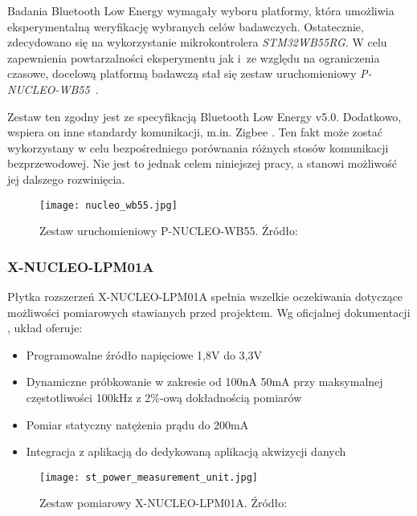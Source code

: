 Badania Bluetooth Low Energy wymagały wyboru platformy, która umożliwia eksperymentalną 
weryfikację wybranych celów badawczych. Ostatecznie, zdecydowano się na wykorzystanie 
mikrokontrolera \textit{STM32WB55RG}. W celu zapewnienia powtarzalności eksperymentu jak 
i~ze względu na ograniczenia czasowe, docelową platformą badawczą stał się zestaw 
uruchomieniowy \textit{P-NUCLEO-WB55}~\cite{noauthor_p-nucleo-wb55_nodate}.

Zestaw ten zgodny jest ze specyfikacją Bluetooth Low Energy v5.0. Dodatkowo, wspiera
on inne standardy komunikacji, m.in. Zigbee \cite{noauthor_stm32wb_2022}.
Ten fakt może zostać wykorzystany w celu bezpośredniego porównania różnych stosów komunikacji bezprzewodowej.
Nie jest to jednak celem niniejszej pracy, a stanowi możliwość jej dalszego 
rozwinięcia.


\begin{figure}[!htb]
	\centering \texttt{[image: nucleo\_wb55.jpg]}
	\caption{Zestaw uruchomieniowy P-NUCLEO-WB55. Źródło: \cite{noauthor_p-nucleo-wb55_nodate}}
	\label{rys:nucleo_wb55}
\end{figure}

\subsubsection{X-NUCLEO-LPM01A}

Płytka rozszerzeń X-NUCLEO-LPM01A spełnia wszelkie oczekiwania dotyczące możliwości pomiarowych
stawianych przed projektem. Wg oficjalnej dokumentacji \cite{noauthor_um2243_2018}, układ oferuje:

\begin{itemize}
\item Programowalne źródło napięciowe 1,8V do 3,3V
\item Dynamiczne próbkowanie w zakresie od 100nA 50mA przy maksymalnej częstotliwości 100kHz z 2\%-ową dokładnością pomiarów
\item Pomiar statyczny natężenia prądu do 200mA
\item Integracja z aplikacją do dedykowaną aplikacją akwizycji danych \cite{noauthor_stm32cubemonpwr_2022}
\end{itemize}

\begin{figure}[!ht]
	\centering \texttt{[image: st\_power\_measurement\_unit.jpg]}
	\caption{Zestaw pomiarowy X-NUCLEO-LPM01A. Źródło: \cite{noauthor_x-nucleo-lpm01a_nodate}}
	\label{rys:nucleo_lpm01a}
\end{figure}

